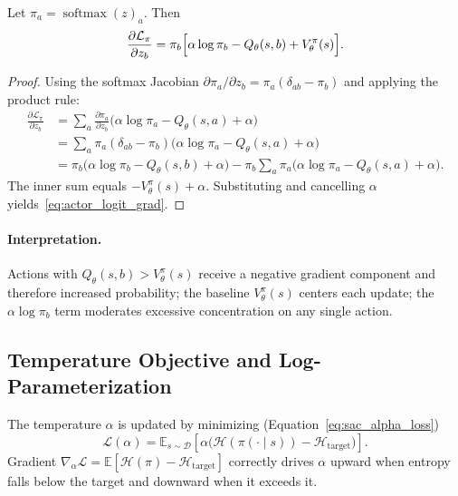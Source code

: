 \begin{proposition}
\label{prop:actor_gradient}
Let $\pi_a = \operatorname{softmax}(z)_a$. Then
\begin{equation}
  \frac{\partial\mathcal{L}_\pi}{\partial z_b}
  = \pi_b\Bigl[\alpha\log\pi_b - Q_\theta(s,b) + V_\theta^\pi(s)\Bigr].
  \label{eq:actor_logit_grad}
\end{equation}
\end{proposition}
\begin{proof}
Using the softmax Jacobian $\partial\pi_a/\partial z_b = \pi_a(\delta_{ab}-\pi_b)$ and applying the product rule:
\begin{align*}
  \frac{\partial\mathcal{L}_\pi}{\partial z_b}
  &= \sum_a\frac{\partial\pi_a}{\partial z_b}
     \bigl(\alpha\log\pi_a - Q_\theta(s,a) + \alpha\bigr) \\
  &= \sum_a\pi_a(\delta_{ab}-\pi_b)
     \bigl(\alpha\log\pi_a - Q_\theta(s,a) + \alpha\bigr) \\
  &= \pi_b\bigl(\alpha\log\pi_b - Q_\theta(s,b) + \alpha\bigr)
     - \pi_b\!\sum_a\pi_a\bigl(\alpha\log\pi_a - Q_\theta(s,a) + \alpha\bigr).
\end{align*}
The inner sum equals $-V_\theta^\pi(s)+\alpha$. Substituting and cancelling $\alpha$ yields~\eqref{eq:actor_logit_grad}.
\end{proof}

\paragraph{Interpretation.} Actions with $Q_\theta(s,b) > V_\theta^\pi(s)$ receive a negative gradient component and therefore increased probability; the baseline $V_\theta^\pi(s)$ centers each update; the $\alpha\log\pi_b$ term moderates excessive concentration on any single action.

\subsection{Temperature Objective and Log-Parameterization}
\label{sec:Appendix_alpha_loss}

The temperature $\alpha$ is updated by minimizing (Equation~\ref{eq:sac_alpha_loss})
\begin{equation}
  \mathcal{L}(\alpha)
  = \mathbb{E}_{s\sim\mathcal{D}}\!\left[
    \alpha\bigl(\mathcal{H}(\pi(\cdot\mid s)) - \mathcal{H}_{\mathrm{target}}\bigr)\right].
  \label{eq:alpha_loss_appendix}
\end{equation}
Gradient $\nabla_\alpha\mathcal{L} = \mathbb{E}[\mathcal{H}(\pi)-\mathcal{H}_{\mathrm{target}}]$ correctly drives $\alpha$ upward when entropy falls below the target and downward when it exceeds it.

